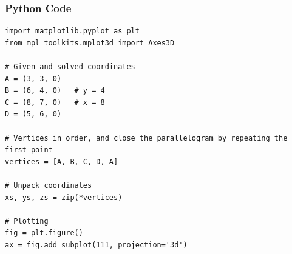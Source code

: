 \documentclass{beamer}
\begin{document}
\begin{frame}[fragile]
    \frametitle{Python Code}
    \begin{lstlisting}
import matplotlib.pyplot as plt
from mpl_toolkits.mplot3d import Axes3D

# Given and solved coordinates
A = (3, 3, 0)
B = (6, 4, 0)   # y = 4
C = (8, 7, 0)   # x = 8
D = (5, 6, 0)

# Vertices in order, and close the parallelogram by repeating the first point
vertices = [A, B, C, D, A]

# Unpack coordinates
xs, ys, zs = zip(*vertices)

# Plotting
fig = plt.figure()
ax = fig.add_subplot(111, projection='3d')




    \end{lstlisting}
\end{frame}
\end{document}
